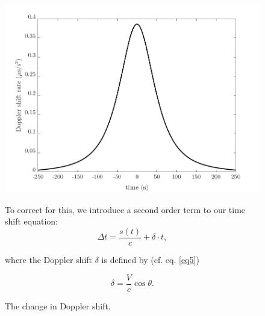 \begin{figure}[ht!]
	\begin{minipage}{.5\textwidth}
		\centering
		\includegraphics[width=\linewidth]{assets/doppler_shift_rate.png}
		\caption{The change in Doppler shift.}
		\label{fig:doppler_shift_rate}
	\end{minipage}%
	\begin{minipage}{.5\textwidth}
		To correct for this, we introduce a second order term to our time shift equation:
		\begin{equation}
		\Delta t = \frac{s(t)}{c} + \delta \cdot t,
		\end{equation}
		
		where the Doppler shift $\delta$ is defined by (cf. eq. \ref{eq5})
		
		\begin{equation}
		\delta = \frac{V}{c} \cos\theta.
		\end{equation}
	\end{minipage}
\end{figure}

